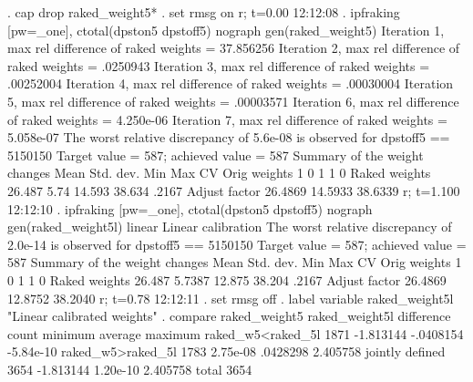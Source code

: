 . cap drop raked_weight5*
{\smallskip}
. set rmsg on
r; t=0.00 12:12:08
{\smallskip}
. ipfraking [pw=_one], ctotal(dpston5 dpstoff5) nograph gen(raked_weight5)
{\smallskip}
 Iteration 1, max rel difference of raked weights = 37.856256
 Iteration 2, max rel difference of raked weights = .0250943
 Iteration 3, max rel difference of raked weights = .00252004
 Iteration 4, max rel difference of raked weights = .00030004
 Iteration 5, max rel difference of raked weights = .00003571
 Iteration 6, max rel difference of raked weights = 4.250e-06
 Iteration 7, max rel difference of raked weights = 5.058e-07
The worst relative discrepancy of  5.6e-08 is observed for dpstoff5 == 5150150     
Target value =        587; achieved value =        587
{\smallskip}
   Summary of the weight changes
{\smallskip}
              {\VBAR}    Mean    Std. dev.    Min        Max       CV
Orig weights  {\VBAR}        1          0         1           1       0
Raked weights {\VBAR}   26.487       5.74    14.593      38.634   .2167
Adjust factor {\VBAR}  26.4869              14.5933     38.6339
r; t=1.100 12:12:10
{\smallskip}
. ipfraking [pw=_one], ctotal(dpston5 dpstoff5) nograph gen(raked_weight5l) linear
{\smallskip}
Linear calibration
The worst relative discrepancy of  2.0e-14 is observed for dpstoff5 == 5150150     
Target value =        587; achieved value =        587
{\smallskip}
   Summary of the weight changes
{\smallskip}
              {\VBAR}    Mean    Std. dev.    Min        Max       CV
Orig weights  {\VBAR}        1          0         1           1       0
Raked weights {\VBAR}   26.487     5.7387    12.875      38.204   .2167
Adjust factor {\VBAR}  26.4869              12.8752     38.2040
r; t=0.78 12:12:11
{\smallskip}
. set rmsg off
{\smallskip}
. label variable raked_weight5l "Linear calibrated weights"
{\smallskip}
. compare raked_weight5 raked_weight5l
{\smallskip}
                                         difference 
                            count       minimum      average     maximum
raked_w{\tytilde}5<raked_{\tytilde}5l          1871     -1.813144    -.0408154   -5.84e-10
raked_w{\tytilde}5>raked_{\tytilde}5l          1783      2.75e-08     .0428298    2.405758
jointly defined              3654     -1.813144     1.20e-10    2.405758
total                        3654
{\smallskip}
